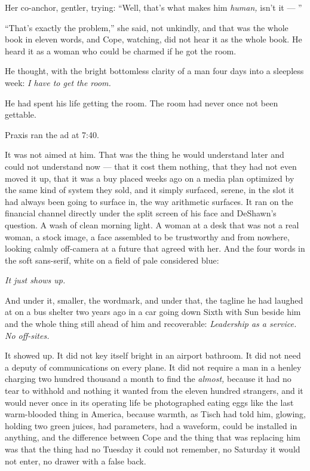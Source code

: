 \documentclass[11pt,openany]{book}
\newcommand{\scenebreak}{\par\vspace{0.5\baselineskip}\begin{center}\textasteriskcentered\quad\textasteriskcentered\quad\textasteriskcentered\end{center}\vspace{0.5\baselineskip}\par}
\begin{document}
Her co-anchor, gentler, trying: ``Well, that's what makes him \textit{human,} isn't it --- ''

``That's exactly the problem,'' she said, not unkindly, and that was the whole book in eleven words, and Cope, watching, did not hear it as the whole book. He heard it as a woman who could be charmed if he got the room.

He thought, with the bright bottomless clarity of a man four days into a sleepless week: \textit{I have to get the room.}

He had spent his life getting the room. The room had never once not been gettable.


\scenebreak


Praxis ran the ad at 7:40.

It was not aimed at him. That was the thing he would understand later and could not understand now --- that it cost them nothing, that they had not even moved it up, that it was a buy placed weeks ago on a media plan optimized by the same kind of system they sold, and it simply surfaced, serene, in the slot it had always been going to surface in, the way arithmetic surfaces. It ran on the financial channel directly under the split screen of his face and DeShawn's question. A wash of clean morning light. A woman at a desk that was not a real woman, a stock image, a face assembled to be trustworthy and from nowhere, looking calmly off-camera at a future that agreed with her. And the four words in the soft sans-serif, white on a field of pale considered blue:

\textit{It just shows up.}

And under it, smaller, the wordmark, and under that, the tagline he had laughed at on a bus shelter two years ago in a car going down Sixth with Sun beside him and the whole thing still ahead of him and recoverable: \textit{Leadership as a service. No off-sites.}

It showed up. It did not key itself bright in an airport bathroom. It did not need a deputy of communications on every plane. It did not require a man in a henley charging two hundred thousand a month to find the \textit{almost,} because it had no tear to withhold and nothing it wanted from the eleven hundred strangers, and it would never once in its operating life be photographed eating eggs like the last warm-blooded thing in America, because warmth, as Tisch had told him, glowing, holding two green juices, had parameters, had a waveform, could be installed in anything, and the difference between Cope and the thing that was replacing him was that the thing had no Tuesday it could not remember, no Saturday it would not enter, no drawer with a false back.
\end{document}
